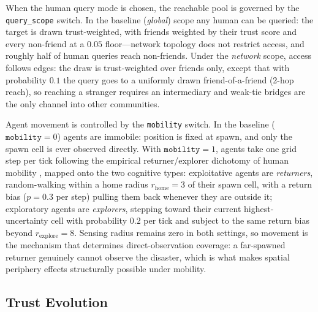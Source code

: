 When the human query mode is chosen, the reachable pool is governed by the
\texttt{query\_scope} switch.
In the baseline (\emph{global}) scope any human can be queried: the target is
drawn trust-weighted, with friends weighted by their trust score and every
non-friend at a $0.05$ floor---network topology does not restrict access, and
roughly half of human queries reach non-friends.
Under the \emph{network} scope, access follows edges: the draw is trust-weighted
over friends only, except that with probability $0.1$ the query goes to a
uniformly drawn friend-of-a-friend (2-hop reach), so reaching a stranger requires
an intermediary and weak-tie bridges are the only channel into other communities.

Agent movement is controlled by the \texttt{mobility} switch.
In the baseline ($\texttt{mobility}=0$) agents are immobile: position is fixed at
spawn, and only the spawn cell is ever observed directly.
With $\texttt{mobility}=1$, agents take one grid step per tick following the
empirical returner/explorer dichotomy of human mobility
\citep{pappalardo2015returners}, mapped onto the two cognitive types:
exploitative agents are \emph{returners}, random-walking within a home radius
$r_{\mathrm{home}}=3$ of their spawn cell, with a return bias ($p=0.3$ per step)
pulling them back whenever they are outside it; exploratory agents are
\emph{explorers}, stepping toward their current highest-uncertainty cell with
probability $0.2$ per tick and subject to the same return bias beyond
$r_{\mathrm{explore}}=8$.
Sensing radius remains zero in both settings, so movement is the mechanism that
determines direct-observation coverage: a far-spawned returner genuinely cannot
observe the disaster, which is what makes spatial periphery effects structurally
possible under mobility.

\subsection{Trust Evolution}

